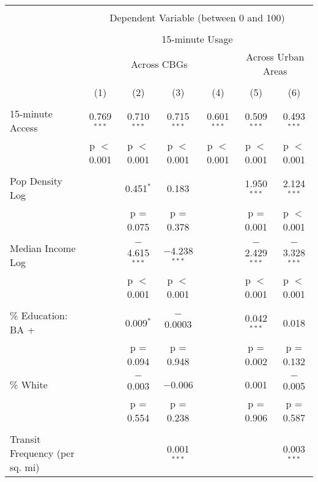 
\begin{table}[!htbp] \centering 
  \caption{} 
  \label{} 
\begin{tabular}{@{\extracolsep{5pt}}lcccccc} 
\\[-1.8ex]\hline 
\hline \\[-1.8ex] 
 & \multicolumn{6}{c}{Dependent Variable (between 0 and 100)} \\ 
\cline{2-7} 
\\[-1.8ex] & \multicolumn{6}{c}{15-minute Usage} \\ 
 & \multicolumn{4}{c}{Across CBGs} & \multicolumn{2}{c}{Across Urban Areas} \\ 
\\[-1.8ex] & (1) & (2) & (3) & (4) & (5) & (6)\\ 
\hline \\[-1.8ex] 
 15-minute Access & 0.769$^{***}$ & 0.710$^{***}$ & 0.715$^{***}$ & 0.601$^{***}$ & 0.509$^{***}$ & 0.493$^{***}$ \\ 
  & p $<$ 0.001 & p $<$ 0.001 & p $<$ 0.001 & p $<$ 0.001 & p $<$ 0.001 & p $<$ 0.001 \\ 
  & & & & & & \\ 
 Pop Density Log &  & 0.451$^{*}$ & 0.183 &  & 1.950$^{***}$ & 2.124$^{***}$ \\ 
  &  & p = 0.075 & p = 0.378 &  & p = 0.001 & p $<$ 0.001 \\ 
  & & & & & & \\ 
 Median Income Log &  & $-$4.615$^{***}$ & $-$4.238$^{***}$ &  & $-$2.429$^{***}$ & $-$3.328$^{***}$ \\ 
  &  & p $<$ 0.001 & p $<$ 0.001 &  & p $<$ 0.001 & p $<$ 0.001 \\ 
  & & & & & & \\ 
 \% Education: BA + &  & 0.009$^{*}$ & $-$0.0003 &  & 0.042$^{***}$ & 0.018 \\ 
  &  & p = 0.094 & p = 0.948 &  & p = 0.002 & p = 0.132 \\ 
  & & & & & & \\ 
 \% White &  & $-$0.003 & $-$0.006 &  & 0.001 & $-$0.005 \\ 
  &  & p = 0.554 & p = 0.238 &  & p = 0.906 & p = 0.587 \\ 
  & & & & & & \\ 
 Transit Frequency (per sq. mi) &  &  & 0.001$^{***}$ &  &  & 0.003$^{***}$ \\ 

\end{tabular}
\end{table}
